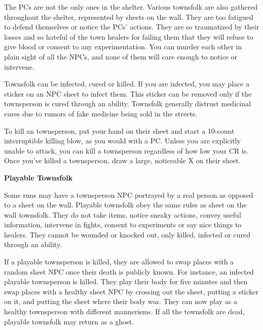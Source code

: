\documentclass[green]{Pestilence}
\begin{document}
\name{\gTownsfolk{}}

The PCs are not the only ones in the shelter. Various townsfolk are also gathered throughout the shelter, represented by sheets on the wall. They are too fatigued to defend themselves or notice the PCs' actions. They are so traumatized by their losses and so hateful of the town healers for failing them that they will refuse to give blood or consent to any experimentation. You can murder each other in plain sight of all the NPCs, and none of them will care enough to notice or intervene.

Townsfolk can be infected, cured or killed. If you are infected, you may place a sticker on an NPC sheet to infect them. This sticker can be removed only if the townsperson is cured through an ability. Townsfolk generally distrust medicinal cures due to rumors of fake medicine being sold in the streets.

To kill an townsperson, put your hand on their sheet and start a 10-count interruptible killing blow, as you would with a PC. Unless you are explicitly unable to attack, you can kill a townsperson regardless of how low your CR is. Once you've killed a townsperson, draw a large, noticeable X on their sheet.

{\bf Playable Townsfolk}

Some runs may have a townsperson NPC portrayed by a real person as opposed to a sheet on the wall. Playable townsfolk obey the same rules as sheet on the wall townsfolk. They do not take items, notice sneaky actions, convey useful information, intervene in fights, consent to experiments or say nice things to healers. They cannot be wounded or knocked out, only killed, infected or cured through an ability.

If a playable townsperson is killed, they are allowed to swap places with a random sheet NPC once their death is publicly known. For instance, an infected playable townsperson is killed. They play their body for five minutes and then swap places with a healthy sheet NPC by crossing out the sheet, putting a sticker on it, and putting the sheet where their body was. They can now play as a healthy townsperson with different mannerisms. If all the townsfolk are dead, playable townsfolk may return as a ghost. 
\end{document}
